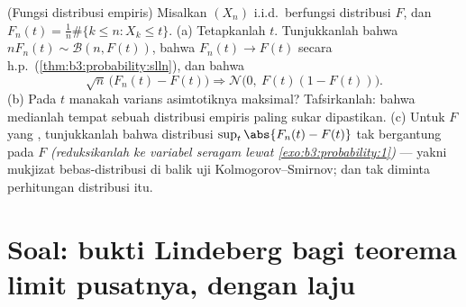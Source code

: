 \begin{exercise}[$\star\star$]\label{exo:b3:clt:12}
(Fungsi distribusi empiris) Misalkan $(X_n)$ i.i.d.\
berfungsi distribusi $F$, dan $F_n(t) =
\frac1n\#\{k \leq n : X_k \leq t\}$.
(a) Tetapkanlah $t$. Tunjukkanlah bahwa $n F_n(t) \sim \mathcal B(n, F(t))$,
bahwa $F_n(t) \to F(t)$ secara h.p.\ (\cref{thm:b3:probability:slln}),
dan bahwa
\[
\sqrt n\,\bigl(F_n(t) - F(t)\bigr) \Longrightarrow
\mathcal N\bigl(0,\ F(t)(1 - F(t))\bigr) .
\]
(b) Pada $t$ manakah varians asimtotiknya maksimal?
Tafsirkanlah: bahwa medianlah tempat sebuah distribusi empiris
paling sukar dipastikan.
(c) Untuk $F$ yang , tunjukkanlah bahwa distribusi
$\sup_t\abs{F_n(t) - F(t)}$ tak bergantung pada $F$
\emph{(reduksikanlah ke variabel seragam lewat
\cref{exo:b3:probability:1})} --- yakni mukjizat bebas-distribusi
di balik uji Kolmogorov--Smirnov; dan tak diminta perhitungan
distribusi itu.
\end{exercise}

\section{Soal: bukti Lindeberg bagi teorema limit pusatnya, dengan
laju}

